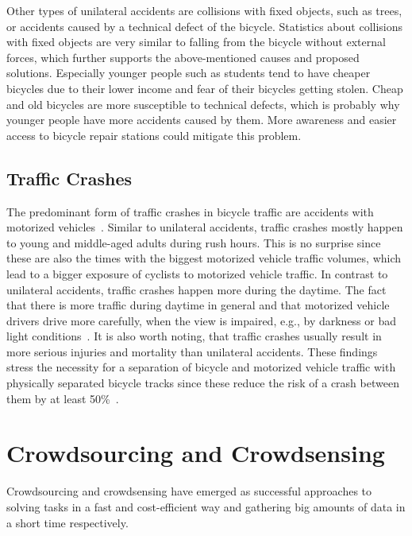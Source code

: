 Other types of unilateral accidents are collisions with fixed objects, such as trees, or accidents caused by a technical defect of the bicycle.
Statistics about collisions with fixed objects are very similar to falling from the bicycle without external forces, which further supports the above-mentioned causes and proposed solutions.
Especially younger people such as students tend to have cheaper bicycles due to their lower income and fear of their bicycles getting stolen.
Cheap and old bicycles are more susceptible to technical defects, which is probably why younger people have more accidents caused by them.
More awareness and easier access to bicycle repair stations could mitigate this problem.

\subsection*{Traffic Crashes}
The predominant form of traffic crashes in bicycle traffic are accidents with motorized vehicles~\cite{juhra2012bicycle,naess2020number}.
Similar to unilateral accidents, traffic crashes mostly happen to young and middle-aged adults during rush hours.
This is no surprise since these are also the times with the biggest motorized vehicle traffic volumes, which lead to a bigger exposure of cyclists to motorized vehicle traffic.
In contrast to unilateral accidents, traffic crashes happen more during the daytime.
The fact that there is more traffic during daytime in general and that motorized vehicle drivers drive more carefully, when the view is impaired, e.g., by darkness or bad light conditions~\cite{schepers2011road}.
It is also worth noting, that traffic crashes usually result in more serious injuries and mortality than unilateral accidents. 
These findings stress the necessity for a separation of bicycle and motorized vehicle traffic with physically separated bicycle tracks since these reduce the risk of a crash between them by at least 50\%~\cite{van2021safety}.


\section{Crowdsourcing and Crowdsensing}
\label{sec:crowdsourcing_crowdsensing_background}
Crowdsourcing and crowdsensing have emerged as successful approaches to solving tasks in a fast and cost-efficient way and gathering big amounts of data in a short time respectively.

